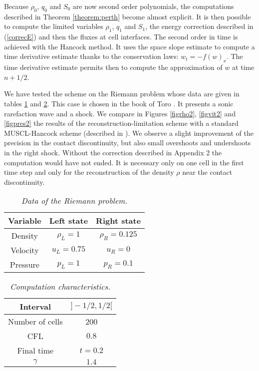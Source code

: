 \documentclass{fldauth}
\theoremstyle{plain}
\theoremstyle{plain}
\theoremstyle{plain}
\theoremstyle{plain}
\theoremstyle{plain}
\theoremstyle{plain}
\begin{document}
Because $\rho_0$, $q_0$ and $S_0$ are now second order
polynomials, the computations described in Theorem
\ref{theorem:perth} become almost explicit. It is then possible to
compute the limited variables $\rho_1$, $q_1$ and $S_1$, the
energy correction described in (\ref{correcE}) and then the fluxes
at cell interfaces. The second order in time is achieved with the
Hancock method. It uses the space slope estimate to compute a time
derivative estimate thanks to the conservation laws:
$w_t=-f(w)_x$. The time derivative estimate permits then to
compute the approximation of $w$ at time $n+1/2$.

We have tested the scheme on the Riemann problem whose data are
given in tables \ref{table1} and \ref{table2}. This case is chosen
in the book of Toro \cite{toro94}. It presents a sonic rarefaction
wave and a shock. We compare in Figures \ref{figrho2},
\ref{figvit2} and \ref{figpres2} the results of the
reconstruction-limitation scheme with a standard MUSCL-Hancock
scheme (described in \cite{toro94}). We observe a slight
improvement of the precision in the contact discontinuity, but
also small overshoots and undershoots in the right shock. Without
the correction described in Appendix 2 the computation would have
not ended. It is necessary only on one cell in the first time step
and only for the reconstruction of the density $\rho$ near the
contact discontinuity.
\begin{table}[h]
\begin{center}
\begin{tabular}{|c|c|c|}
\hline Variable & Left state & Right state \\
\hline  Density & $\rho_L=1$ & $\rho_R=0.125$\\
\hline  Velocity & $u_L=0.75$ & $u_R=0$\\
\hline Pressure & $p_L=1$ & $p_R=0.1$\\
\hline
\end{tabular}
\caption{\label{table1}\textit{Data of the Riemann problem.}}
\end{center}
\end{table}
\begin{table}[h]
\begin{center}
\begin{tabular}{|c|c|}
\hline Interval & $]-1/2,1/2[$  \\
\hline  Number of cells & 200 \\
\hline  CFL & $0.8$ \\
\hline Final time & $t=0.2$ \\
\hline $\gamma$ & $1.4$ \\
\hline
\end{tabular}
\caption{\label{table2}\textit{Computation characteristics.}}
\end{center}
\end{table}
\end{document}
